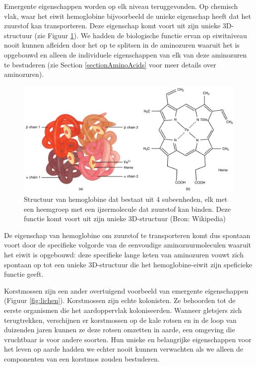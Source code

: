 \documentclass[
  11pt,
]{book}
\begin{document}
Emergente eigenschappen worden op elk niveau teruggevonden. Op chemisch vlak, waar het eiwit hemoglobine bijvoorbeeld de unieke eigenschap heeft dat het zuurstof kan transporteren. Deze eigenschap komt voort uit zijn unieke 3D-structuur (zie Figuur \ref{fig:hemoglobin}). We hadden de biologische functie ervan op eiwitniveau nooit kunnen afleiden door het op te splitsen in de aminozuren waaruit het is opgebouwd en alleen de individuele eigenschappen van elk van deze aminozuren te bestuderen (zie Section \ref{sectionAminoAcids} voor meer details over aminozuren).

\begin{figure}

{\centering \includegraphics[width=1\linewidth]{./figs/hemoglobin} 

}

\caption{Structuur van hemoglobine dat bestaat uit 4 subeenheden, elk met een heemgroep met een ijzermolecule dat zuurstof kan binden. Deze functie komt voort uit zijn unieke 3D-structuur (Bron:  Wikipedia)}\label{fig:hemoglobin}
\end{figure}

De eigenschap van hemoglobine om zuurstof te transporteren komt dus spontaan voort door de specifieke volgorde van de eenvoudige aminozuurmoleculen waaruit het eiwit is opgebouwd: deze specifieke lange keten van aminozuren vouwt zich spontaan op tot een unieke 3D-structuur die het hemoglobine-eiwit zijn speficieke functie geeft.

\pagebreak

Korstmossen zijn een ander overtuigend voorbeeld van emergente eigenschappen (Figuur \ref{fig:lichen}). Korstmossen zijn echte kolonisten. Ze behoorden tot de eerste organismen die het aardoppervlak koloniseerden. Wanneer gletsjers zich terugtrekken, verschijnen er korstmossen op de kale rotsen en in de loop van duizenden jaren kunnen ze deze rotsen omzetten in aarde, een omgeving die vruchtbaar is voor andere soorten. Hun unieke en belangrijke eigenschappen voor het leven op aarde hadden we echter nooit kunnen verwachten als we alleen de componenten van een korstmos zouden bestuderen.
\end{document}
